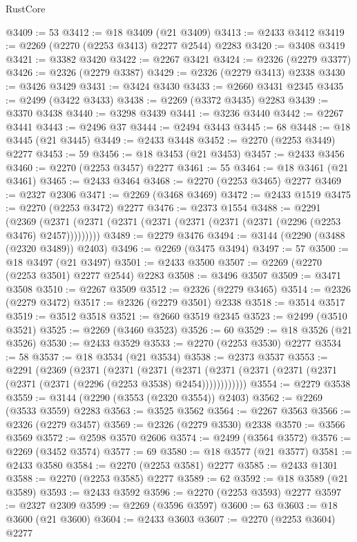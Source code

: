 \begin{lexlean}{RustCore}
\begin{coremodule}
@3409 := 53
@3412 := @18 @3409 (@21 @3409)
@3413 := @2433 @3412
@3419 := @2269 (@2270 (@2253 @3413) @2277 @2544) @2283
@3420 := @3408 @3419
@3421 := @3382 @3420
@3422 := @2267 @3421
@3424 := @2326 (@2279 @3377)
@3426 := @2326 (@2279 @3387)
@3429 := @2326 (@2279 @3413) @2338
@3430 := @3426 @3429
@3431 := @3424 @3430
@3433 := @2660 @3431 @2345
@3435 := @2499 (@3422 @3433)
@3438 := @2269 (@3372 @3435) @2283
@3439 := @3370 @3438
@3440 := @3298 @3439
@3441 := @3236 @3440
@3442 := @2267 @3441
@3443 := @2496 @37
@3444 := @2494 @3443
@3445 := 68
@3448 := @18 @3445 (@21 @3445)
@3449 := @2433 @3448
@3452 := @2270 (@2253 @3449) @2277
@3453 := 59
@3456 := @18 @3453 (@21 @3453)
@3457 := @2433 @3456
@3460 := @2270 (@2253 @3457) @2277
@3461 := 55
@3464 := @18 @3461 (@21 @3461)
@3465 := @2433 @3464
@3468 := @2270 (@2253 @3465) @2277
@3469 := @2327 @2306
@3471 := @2269 (@3468 @3469)
@3472 := @2433 @1519
@3475 := @2270 (@2253 @3472) @2277
@3476 := @2373 @1554
@3488 := @2291
    (@2369 (@2371 (@2371 (@2371 (@2371 (@2371 (@2371 (@2371 (@2296 (@2253 @3476) @2457)))))))))
@3489 := @2279 @3476
@3494 := @3144 (@2290 (@3488 (@2320 @3489)) @2403)
@3496 := @2269 (@3475 @3494)
@3497 := 57
@3500 := @18 @3497 (@21 @3497)
@3501 := @2433 @3500
@3507 := @2269 (@2270 (@2253 @3501) @2277 @2544) @2283
@3508 := @3496 @3507
@3509 := @3471 @3508
@3510 := @2267 @3509
@3512 := @2326 (@2279 @3465)
@3514 := @2326 (@2279 @3472)
@3517 := @2326 (@2279 @3501) @2338
@3518 := @3514 @3517
@3519 := @3512 @3518
@3521 := @2660 @3519 @2345
@3523 := @2499 (@3510 @3521)
@3525 := @2269 (@3460 @3523)
@3526 := 60
@3529 := @18 @3526 (@21 @3526)
@3530 := @2433 @3529
@3533 := @2270 (@2253 @3530) @2277
@3534 := 58
@3537 := @18 @3534 (@21 @3534)
@3538 := @2373 @3537
@3553 := @2291
    (@2369
      (@2371
        (@2371
          (@2371
            (@2371 (@2371 (@2371 (@2371 (@2371 (@2371 (@2371 (@2296 (@2253 @3538) @2454))))))))))))
@3554 := @2279 @3538
@3559 := @3144 (@2290 (@3553 (@2320 @3554)) @2403)
@3562 := @2269 (@3533 @3559) @2283
@3563 := @3525 @3562
@3564 := @2267 @3563
@3566 := @2326 (@2279 @3457)
@3569 := @2326 (@2279 @3530) @2338
@3570 := @3566 @3569
@3572 := @2598 @3570 @2606
@3574 := @2499 (@3564 @3572)
@3576 := @2269 (@3452 @3574)
@3577 := 69
@3580 := @18 @3577 (@21 @3577)
@3581 := @2433 @3580
@3584 := @2270 (@2253 @3581) @2277
@3585 := @2433 @1301
@3588 := @2270 (@2253 @3585) @2277
@3589 := 62
@3592 := @18 @3589 (@21 @3589)
@3593 := @2433 @3592
@3596 := @2270 (@2253 @3593) @2277
@3597 := @2327 @2309
@3599 := @2269 (@3596 @3597)
@3600 := 63
@3603 := @18 @3600 (@21 @3600)
@3604 := @2433 @3603
@3607 := @2270 (@2253 @3604) @2277

\end{coremodule}
\end{lexlean}
